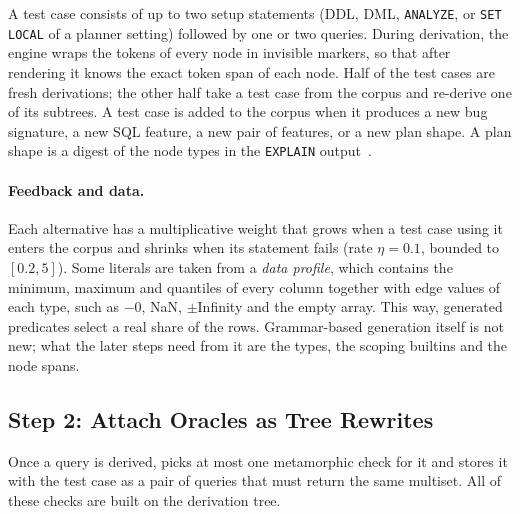 A test case consists of up to two setup statements (DDL, DML, \texttt{ANALYZE},
or \texttt{SET LOCAL} of a planner setting) followed by one or two queries.
During derivation, the engine wraps the tokens of every node in invisible
markers, so that after rendering it knows the exact token span of each node.
Half of the test cases are fresh derivations; the other half take a test case
from the corpus and re-derive one of its subtrees. A test case is added to the
corpus when it produces a new bug signature, a new SQL feature, a new pair of
features, or a new plan shape. A plan shape is a digest of the node types in the
\texttt{EXPLAIN} output~\cite{ba2023qpg}.

\paragraph{Feedback and data.} Each alternative has a multiplicative weight
that grows when a test case using it enters the corpus and shrinks when its
statement fails (rate $\eta=0.1$, bounded to $[0.2,5]$). Some literals are taken
from a \emph{data profile}, which contains the minimum, maximum and quantiles of
every column together with edge values of each type, such as $-0$, NaN,
$\pm$Infinity and the empty array. This way, generated predicates select a
real share of the rows. Grammar-based generation itself is not new; what the
later steps need from it are the types, the scoping builtins and the node
spans.

\subsection{Step 2: Attach Oracles as Tree Rewrites}
\label{sec:oracles}

Once a query is derived, \tool picks at most one metamorphic check for it and
stores it with the test case as a pair of queries that must return the same
multiset. All of these checks are built on the derivation tree.

